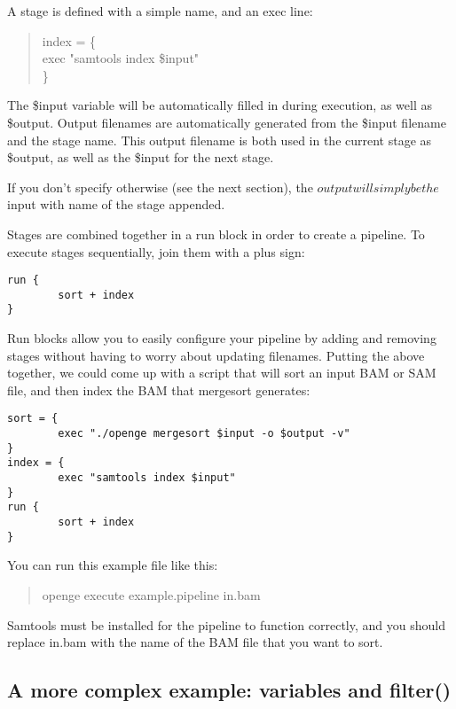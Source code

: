 \documentclass[11pt]{article}
\newcommand {\cmd}[1] {\begin{quote}#1\end{quote}}
\begin{document}
A stage is defined with a simple name, and an exec line:
\cmd{
index = \{\\
\indent exec "samtools index \$input"\\
\}}

The \$input variable will be automatically filled in during execution, as well as \$output. Output filenames are automatically generated from the \$input filename and the stage name. This output filename is both used in the current stage as \$output, as well as the \$input for the next stage.

If you don't specify otherwise (see the next section), the $output will simply be the $input with name of the stage appended.

Stages are combined together in a run block in order to create a pipeline. To execute stages sequentially, join them with a plus sign:
\begin{verbatim}
run {
        sort + index
}
\end{verbatim}
Run blocks allow you to easily configure your pipeline by adding and removing stages without having to worry about updating filenames. Putting the above together, we could come up with a script that will sort an input BAM or SAM file, and then index the BAM that mergesort generates:

\begin{verbatim}
sort = {
        exec "./openge mergesort $input -o $output -v"
}
index = {
        exec "samtools index $input"
}
run {
        sort + index
}
\end{verbatim}

You can run this example file like this:

\cmd{openge execute example.pipeline in.bam}

Samtools must be installed for the pipeline to function correctly, and you should replace in.bam with the name of the BAM file that you want to sort.

\subsection {A more complex example: variables and filter()}
\end{document}

